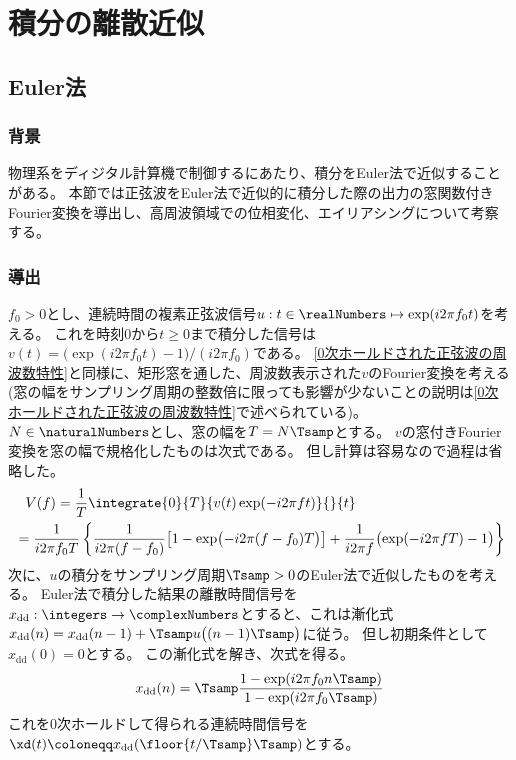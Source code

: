 \chapter{積分の離散近似}
    \section{Euler法}
        \subsection{背景}
            物理系をディジタル計算機で制御するにあたり、積分をEuler法で近似することがある。
            本節では正弦波をEuler法で近似的に積分した際の出力の窓関数付きFourier変換を導出し、高周波領域での位相変化、エイリアシングについて考察する。
        \subsection{導出}
            \newcommand{\xdd}{x_\text{dd}}
            $f_0>0$とし、連続時間の複素正弦波信号$u:t\in\realNumbers\mapsto\exp(i 2\pi f_0 t)$を考える。
            これを時刻$0$から$t\geq 0$まで積分した信号は$v(t) = \bigl(\exp(i 2\pi f_0 t)-1\bigr) / (i 2\pi f_0)$である。
            \ref{0次ホールドされた正弦波の周波数特性}と同様に、矩形窓を通した、周波数表示された$v$のFourier変換を考える(窓の幅をサンプリング周期の整数倍に限っても影響が少ないことの説明は\ref{0次ホールドされた正弦波の周波数特性}で述べられている)。
            $N\in\naturalNumbers$とし、窓の幅を$T=N\Tsamp$とする。
            $v$の窓付きFourier変換を窓の幅で規格化したものは次式である。
            但し計算は容易なので過程は省略した。
            \begin{align*}
                &\phantom{=} V(f) = \frac{1}{T} \integrate{0}{T}{v(t)\exp(-i 2\pi f t)}{}{t} \\
                &= \frac{1}{i 2\pi f_0 T} \left\{\frac{1}{i 2\pi (f-f_0)}\bigl[1 - \exp\bigl(-i 2\pi (f-f_0)T\bigr)\bigr] + \frac{1}{i 2\pi f}\bigl(\exp(-i 2\pi f T) - 1\bigr)\right\}
            \end{align*}
            次に、$u$の積分をサンプリング周期$\Tsamp>0$のEuler法で近似したものを考える。
            Euler法で積分した結果の離散時間信号を$\xdd:\integers\to\complexNumbers$とすると、これは漸化式$\xdd(n) = \xdd(n-1) + \Tsamp u\bigl((n-1)\Tsamp\bigr)$に従う。
            但し初期条件として$\xdd(0)=0$とする。
            この漸化式を解き、次式を得る。
            \[ \xdd(n) = \Tsamp\frac{1-\exp(i 2\pi f_0 n\Tsamp)}{1-\exp(i 2\pi f_0\Tsamp)} \]
            これを0次ホールドして得られる連続時間信号を$\xd(t) \coloneqq \xdd(\floor{t/\Tsamp}\Tsamp)$とする。
